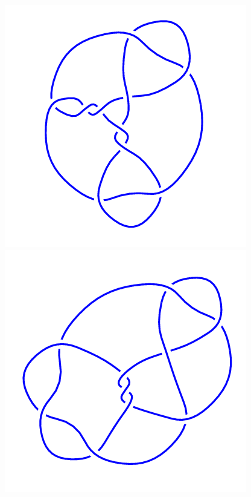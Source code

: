 \begin{figure}[H]
	\begin{minipage}[b]{.18\linewidth}
		\centering
		\includegraphics[width=\linewidth]{../data/10_67.png}
	\end{minipage}
	\begin{minipage}[b]{.18\linewidth}
		\centering
		\includegraphics[width=\linewidth]{../data/10_68.png}

\end{minipage}
\end{figure}
